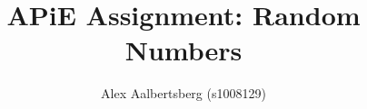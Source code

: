 \documentclass[12pt,a4paper]{article}
\begin{document}
	\author{Alex Aalbertsberg (s1008129)}
	\title{APiE Assignment: Random Numbers}
	
	\maketitle
	
	
	
	
	
	
\end{document}
